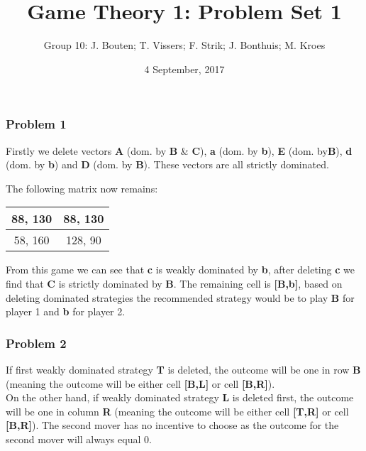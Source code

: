 \documentclass[]{article}
\author{Group 10: J. Bouten; T. Vissers; F. Strik; J. Bonthuis; M. Kroes}
\date{4 September, 2017}
\title{Game Theory 1: Problem Set 1}
\begin{document}
\maketitle



\subsubsection{Problem 1}\label{problem-1}

Firstly we delete vectors \textbf{A} (dom. by \textbf{B} \& \textbf{C}), \textbf{a} (dom. by  \textbf{b}), \textbf{E} (dom. by\textbf{B}), \textbf{d} (dom. by \textbf{b})
and \textbf{D} (dom. by \textbf{B}). These vectors are all strictly dominated.

The following matrix now remains:

\begin{tabular}{| c | c |}
  \hline			
  88, 130 &  88, 130 \\
\hline
  58, 160 & 128, 90 \\
  \hline  
\end{tabular}

From this game we can see that \textbf{c} is weakly dominated by \textbf{b}, after
deleting \textbf{c} we find that \textbf{C} is strictly dominated by \textbf{B}. The
remaining cell is \textbf{[B,b]}, based on deleting dominated
strategies the recommended strategy would be to play \textbf{B} for
player 1 and \textbf{b} for player 2.


\subsubsection{Problem 2}\label{problem-2}

If first weakly dominated strategy \textbf{T} is deleted, the outcome will be one in row \textbf{B} (meaning the outcome will be either cell \textbf{[B,L]} or cell \textbf{[B,R]}). \\

On the other hand, if weakly dominated strategy \textbf{L} is deleted first, the outcome will be one in column \textbf{R} (meaning the outcome will be either cell \textbf{[T,R]} or cell \textbf{[B,R]}).
The second mover has no incentive to choose as the outcome for the second mover will always equal 0. \\
\end{document}
